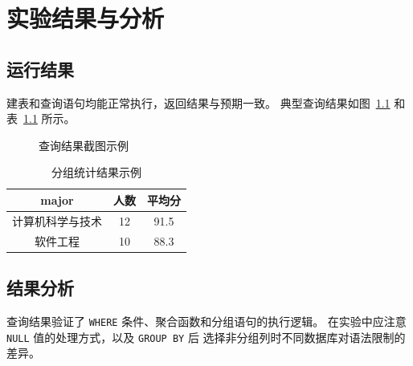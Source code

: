 \chapter{实验结果与分析}

\section{运行结果}

建表和查询语句均能正常执行，返回结果与预期一致。
典型查询结果如图~\cref{fig:result} 和表~\cref{tab:result} 所示。

\begin{figure}[htbp]
  \centering
  \caption{查询结果截图示例}\label{fig:result}
\end{figure}

\begin{table}[htbp]
  \centering
  \caption{分组统计结果示例}\label{tab:result}
  \begin{tabular}{ccc}
    \toprule
    major & 人数 & 平均分 \\
    \midrule
    计算机科学与技术 & 12 & 91.5 \\
    软件工程 & 10 & 88.3 \\
    \bottomrule
  \end{tabular}
\end{table}

\section{结果分析}

查询结果验证了 \verb|WHERE| 条件、聚合函数和分组语句的执行逻辑。
在实验中应注意 \verb|NULL| 值的处理方式，以及 \verb|GROUP BY| 后
选择非分组列时不同数据库对语法限制的差异。
